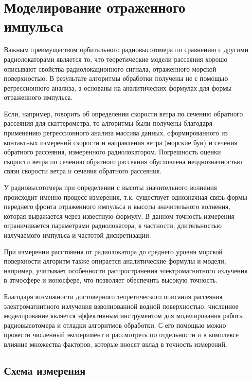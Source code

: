 
\section{Моделирование отраженного импульса}
\label{sec:pulse_modeling}

Важным преимуществом орбитального радиовысотомера по сравнению с другими радиолокаторами является то, что теоретические модели рассеяния хорошо
описывают свойства радиолокационного сигнала, отраженного морской поверхностью.
В результате алгоритмы обработки получены не с помощью регрессионного анализа,
а основаны на аналитических формулах для формы отраженного импульса.

Если, например, говорить об определении скорости ветра по сечению обратного
рассеяния для скаттерометра, то алгоритмы были получены благодаря применению
регрессионного анализа массива данных, сформированного из контактных измерений
скорости и направления ветра (морские буи) и сечения обратного рассеяния,
измеренного радиолокатором. Погрешность оценки скорости ветра
по сечению обратного рассеяния обусловлена неоднозначностью связи скорости
ветра и сечения обратного рассеяния.

У радиовысотомера при определении с высоты значительного волнения происходит
именно процесс измерения, т.к. существует однозначная связь формы переднего
фронта отраженного импульса и высоты значительного волнения, которая выражается
через известную формулу. В данном точность измерения ограничивается параметрами
радиолокатора, в частности, длительностью излучаемого импульса и частотой
дискретизации.

При измерении расстояния от радиолокатора до среднего уровня морской
поверхности алгоритм также опирается аналитические формулы и модели, например,
учитывает особенности распространения электромагнитного излучения в атмосфере и
ионосфере, что позволяет обеспечить высокую точность.

Благодаря возможности достоверного теоретического  описания рассеяния
электромагнитного излучения взволнованной водной поверхностью, численное
моделирование является эффективным инструментом для моделирования работы
радиовысотомера и отладки алгоритмов обработки. С его помощью можно провести
численный эксперимент и рассмотреть по отдельности и в комплексе влияние
множества факторов, которые вносят вклад в точность измерений.

\subsection{Схема измерения}%
\label{sub:skhema_izmereniia}

